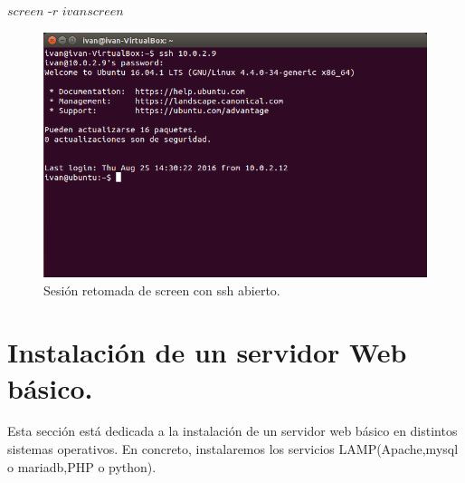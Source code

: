 $screen$ -$r$ $ivanscreen$\\

\begin{figure}[H]
	\centering
	\includegraphics[width=0.7\linewidth]{ScreenVolver}
	\caption[ScreenVolver]{Sesión retomada de screen con ssh abierto.}
	\label{fig:ScreenVolver}
\end{figure}



\section{Instalación de un servidor Web básico.}

Esta sección está dedicada a la instalación de un servidor web básico en distintos sistemas operativos. En concreto, instalaremos los servicios LAMP(Apache,mysql o mariadb,PHP o python).
